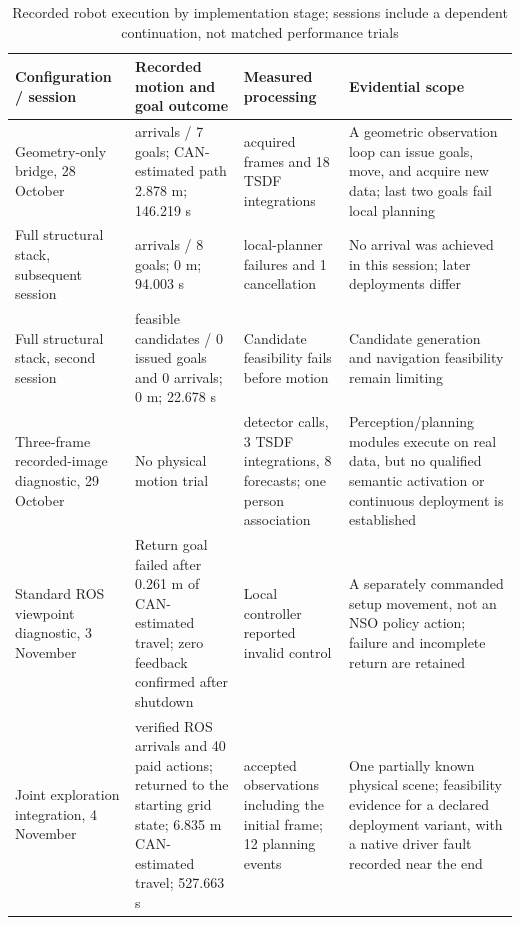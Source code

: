 \begin{table}[!htbp]
\caption{Recorded robot execution by implementation stage; sessions include a dependent continuation, not matched performance trials}\label{tab:7}
\small\renewcommand{\arraystretch}{1.12}\setlength{\tabcolsep}{3pt}
\setlength{\JournalTableWidth}{\dimexpr\linewidth-6\tabcolsep\relax}
\begin{tabular}{@{}>{\raggedright\arraybackslash}p{0.22\JournalTableWidth} >{\raggedright\arraybackslash}p{0.24\JournalTableWidth} >{\raggedright\arraybackslash}p{0.24\JournalTableWidth} >{\raggedright\arraybackslash}p{0.3\JournalTableWidth}@{}}
\toprule
Configuration / session & Recorded motion and goal outcome & Measured processing & Evidential scope \\
\midrule
Geometry-only bridge, 28 October & 5 arrivals / 7 goals; CAN-estimated path 2.878 m; 146.219 s & 18 acquired frames and 18 TSDF integrations & A geometric observation loop can issue goals, move, and acquire new data; last two goals fail local planning \\
Full structural stack, subsequent session & 0 arrivals / 8 goals; 0 m; 94.003 s & 7 local-planner failures and 1 cancellation & No arrival was achieved in this session; later deployments differ \\
Full structural stack, second session & 0 feasible candidates / 0 issued goals and 0 arrivals; 0 m; 22.678 s & Candidate feasibility fails before motion & Candidate generation and navigation feasibility remain limiting \\
Three-frame recorded-image diagnostic, 29 October & No physical motion trial & 3 detector calls, 3 TSDF integrations, 8 forecasts; one person association & Perception/planning modules execute on real data, but no qualified semantic activation or continuous deployment is established \\
Standard ROS viewpoint diagnostic, 3 November & Return goal failed after 0.261 m of CAN-estimated travel; zero feedback confirmed after shutdown & Local controller reported invalid control & A separately commanded setup movement, not an NSO policy action; failure and incomplete return are retained \\
Joint exploration integration, 4 November & 40 verified ROS arrivals and 40 paid actions; returned to the starting grid state; 6.835 m CAN-estimated travel; 527.663 s & 41 accepted observations including the initial frame; 12 planning events & One partially known physical scene; feasibility evidence for a declared deployment variant, with a native driver fault recorded near the end \\

\end{tabular}
\end{table}
